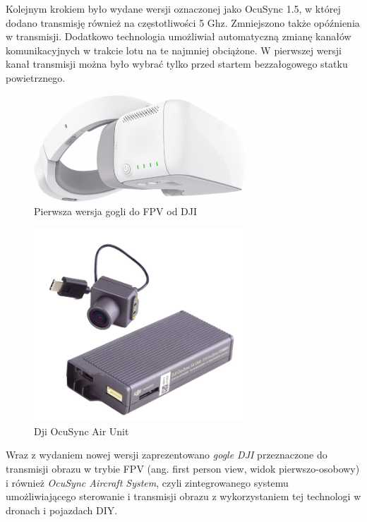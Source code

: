 Kolejnym krokiem było wydane wersji oznaczonej jako OcuSync 1.5, w której dodano transmisję również na częstotliwości 5 Ghz. Zmniejszono także opóźnienia w transmisji. Dodatkowo technologia umożliwiał automatyczną zmianę kanałów komunikacyjnych w trakcie lotu na te najmniej obciążone. W pierwszej wersji kanał
transmisji można było wybrać tylko przed startem bezzałogowego statku powietrznego.\cite{ocusync-yt}

\begin{center}
\begin{figure}[!ht]
  \includegraphics[width=8cm]{./Obrazy/dji-google.png}
  \caption{Pierwsza wersja gogli do FPV od DJI}
  \end{figure}
\end{center}
  
  \begin{center}
\begin{figure}[!ht]
  \includegraphics[width=8cm]{./Obrazy/dji-air-unit.png}
  \caption{Dji OcuSync Air Unit}
  \end{figure}
\end{center}

Wraz z wydaniem nowej wersji zaprezentowano \textit{gogle DJI} przeznaczone do transmisji obrazu w trybie FPV (ang. first person view, widok pierwszo-osobowy) i również \textit{OcuSync Aircraft System}, czyli zintegrowanego systemu umożliwiającego sterowanie i transmisji obrazu z wykorzystaniem tej technologi w dronach i pojazdach DIY.

